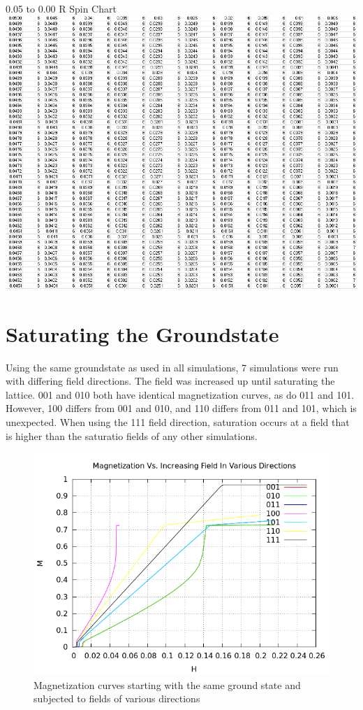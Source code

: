 \documentclass{article}
\begin{document}
\begin{center}
\LARGE 0.05 to 0.00 R Spin Chart
 \includegraphics[keepaspectratio,scale=0.7]{111_3000/005to000RSpinChart.png}
\end{center}
\clearpage

\section{Saturating the Groundstate}
Using the same groundstate as used in all simulations, 7 simulations were run with differing field directions. The 
field was increased up until saturating the lattice. 001 and 010 both have identical magnetization curves, as do
011 and 101. However, 100 differs from 001 and 010, and 110 differs from 011 and 101, which is unexpected. When using
the 111 field direction, saturation occurs at a field that is higher than the saturatio fields of any other simulations. 
\begin{figure}[ht]
 \centering
 \includegraphics[scale=0.6]{HVariedData/Increasing/IncreasingField.png}
 \caption{Magnetization curves starting with the same ground state and subjected to fields of various directions}
\end{figure}
\clearpage
\end{document}
